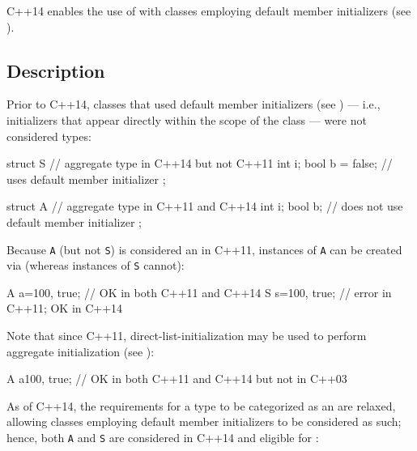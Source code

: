 

\setcounter{table}{0}
\setcounter{footnote}{0}
\setcounter{lstlisting}{0}


C++14 enables the use of  with classes
employing default member initializers (see ).

\subsection[Description]{Description}\label{description}

Prior to C++14, classes that used default member initializers (see ) --- i.e., initializers that appear directly within the
scope of the class --- were not considered  types:

\begin{emcppslisting}[language=C++]
struct S                // aggregate type in C++14 but not C++11
{
    int i;
    bool b = false;     // uses default member initializer
};

struct A                // aggregate type in C++11 and C++14
{
    int  i;
    bool b;             // does not use default member initializer
};
\end{emcppslisting}

\noindent Because \lstinline!A! (but not \lstinline!S!) is considered an  in
C++11, instances of \lstinline!A! can be created via  (whereas instances of \lstinline!S! cannot):

\begin{emcppslisting}[language=C++]
A a={100, true};  // OK in both C++11 and C++14
S s={100, true};  // error in C++11; OK in C++14
\end{emcppslisting}


\noindent Note that since C++11, direct-list-initialization may be used to perform aggregate initialization (see ):
\begin{emcppslisting}[language=C++]
A a{100, true};  // OK in both C++11 and C++14 but not in C++03
\end{emcppslisting}
As of C++14, the requirements for a type to be categorized as an
 are relaxed, allowing classes employing default
member initializers to be considered as such; hence, both \lstinline!A! and
\lstinline!S! are considered  in C++14 and eligible for
:

